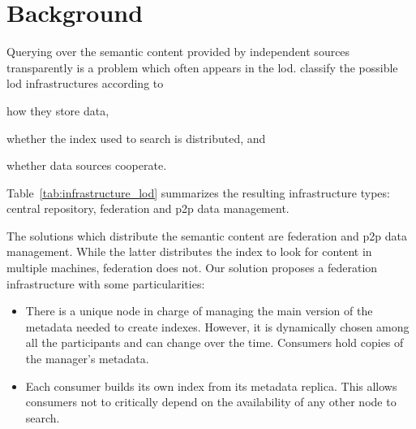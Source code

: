 \section{Background}
\label{background}

Querying over the semantic content provided by independent sources transparently is a problem which often appears in the \acf{lod}.
\citet{gorlitz_federated_2011} classify the possible \ac{lod} infrastructures according to
\begin{enumerate*}[label=\itshape(\arabic*\upshape)]
  \item how they store data,
  \item whether the index used to search is distributed, and
  \item whether data sources cooperate.
\end{enumerate*}
Table~\ref{tab:infrastructure_lod} summarizes the resulting infrastructure types: central repository, federation and \ac{p2p} data management.





The solutions which distribute the semantic content are federation and \ac{p2p} data management.
While the latter distributes the index to look for content in multiple machines, federation does not.
Our solution proposes a federation infrastructure with some particularities:
\begin{itemize}
  \item There is a unique node in charge of managing the main version of the metadata needed to create indexes.
	However, it is dynamically chosen among all the participants and can change over the time.
	Consumers hold copies of the manager's metadata.
  \item Each consumer builds its own index from its metadata replica.
	This allows consumers not to critically depend on the availability of any other node to search. %
\end{itemize}


